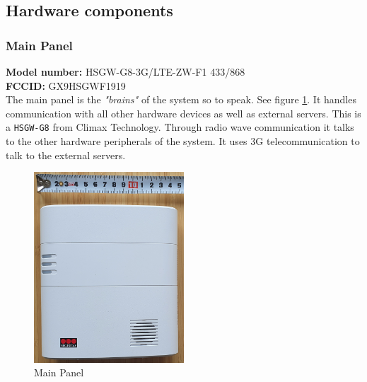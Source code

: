 \subsection{Hardware components} \label{ch:system:hardware}
\subsubsection{Main Panel}
\textbf{Model number:} HSGW-G8-3G/LTE-ZW-F1 433/868 \\
\textbf{FCCID:} GX9HSGWF1919 \\
The main panel is the \textit{"brains"} of the system so to speak. See figure \ref{fig:main-panel}. It handles communication with all other hardware devices as well as external servers. This is a \texttt{HSGW-G8} from Climax Technology. Through radio wave communication it talks to the other hardware peripherals of the system. It uses 3G telecommunication to talk to the external servers.
\begin{figure}[!ht]
  \begin{center}
    \includegraphics[width=0.5\textwidth]{images/main-panel.png}
  \end{center}
  \caption{Main Panel}
  \label{fig:main-panel}
\end{figure}

